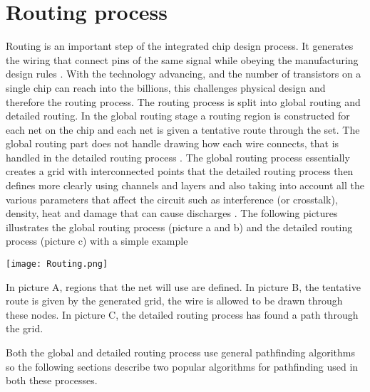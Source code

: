 \documentclass{kththesis}
\begin{document}
\section{Routing process}
Routing is an important step of the integrated chip design process. It generates the wiring that connect pins of the same signal while obeying the manufacturing design rules \parencite{EDA_routing}. With the technology advancing, and the number of transistors on a single chip can reach into the billions, this challenges physical design and therefore the routing process.
The routing process is split into global routing and detailed routing. In the global routing stage a routing region is constructed for each net on the chip and each net is given a tentative route through the set. The global routing part does not handle drawing how each wire connects, that is handled in the detailed routing process \parencite{routing11}. The global routing process essentially creates a grid with interconnected points that the detailed routing process then defines more clearly using channels and layers and also taking into account all the various parameters that affect the circuit such as interference (or crosstalk), density, heat and damage that can cause discharges \parencite{EDA_routing}. The following pictures illustrates the global routing process (picture a and b) and the detailed routing process (picture c) with a simple example

\texttt{[image: Routing.png]}

In picture A, regions that the net will use are defined. In picture B, the tentative route is given by the generated grid, the wire is allowed to be drawn through these nodes. In picture C, the detailed routing process has found a path through the grid.

Both the global and detailed routing process use general pathfinding algorithms so the following sections describe two popular algorithms for pathfinding used in both these processes.
\end{document}
